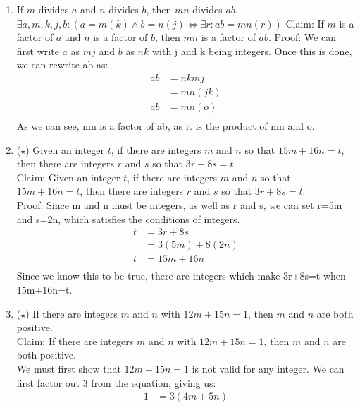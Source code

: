 \documentclass{letter}
\theoremstyle{definition}
\begin{document}
\begin{description}
\begin{enumerate}
		\item If $m$ divides $a$ and $n$ divides $b$, then $mn$ divides $ab$. \\
$ \exists a,m,k,j,b: (a=m(k) \wedge b=n(j) \Leftrightarrow \exists r: ab=mn(r))$
Claim: If $m$ is a factor of $a$ and $n$ is a factor of $b$, then $mn$ is a factor of $ab$.
Proof: We can first write $a$ as $mj$ and $b$ as $nk$ with j and k being integers. Once this is done, we can rewrite ab as: \\
\begin{align*}
ab&=nkmj \\
&=mn(jk) \\
ab &= mn(o) \tag{set jk to o} \\
\end{align*}
As we can see, mn is a factor of ab, as it is the product of mn and o. \\
                \item ($\star$)  Given an integer $t$, if there are integers $m$ and $n$ so that $15m+16n=t$, then there are integers $r$ and $s$ so that $3r+8s=t$. \\
Claim:  Given an integer $t$, if there are integers $m$ and $n$ so that $15m+16n=t$, then there are integers $r$ and $s$ so that $3r+8s=t$. \\
Proof: Since m and n must be integers, as well as r and s, we can set r=5m and s=2n, which satisfies the conditions of integers. \\
\begin{align*}
t &= 3r + 8s \\
&= 3(5m)+8(2n) \tag{plugged in values of r and s} \\
t &= 15m +16n \tag{Solved for the values above} \\
\end{align*}
Since we know this to be true, there are integers which make 3r+8s=t when 15m+16n=t. \\
		\item ($\star$) If there are integers $m$ and $n$ with $12m+15n=1$, then $m$ and $n$ are both positive. \\
Claim: If there are integers $m$ and $n$ with $12m+15n=1$, then $m$ and $n$ are both positive. \\
We must first show that $12m+15n=1$ is not valid for any integer. We can first factor out 3 from the equation, giving us: \\
\begin{align*}
 1 &= 3(4m+5n) \\
\end{align*}

\end{enumerate}
\end{description}
\end{document}
